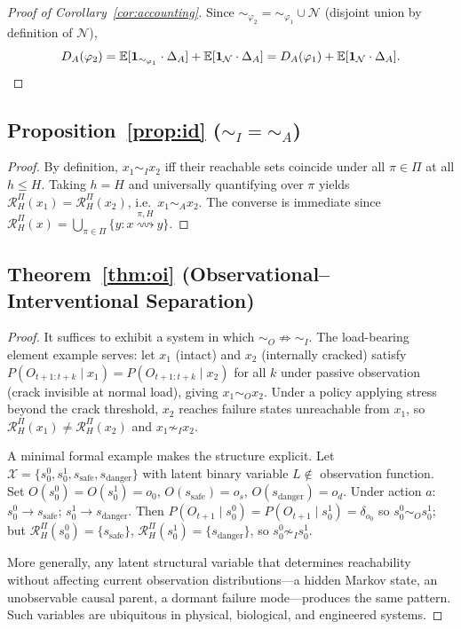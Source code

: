 \documentclass[10pt,twocolumn]{article}
\theoremstyle{plain}
\theoremstyle{definition}
\theoremstyle{remark}
\newcommand{\simA}{\sim_{\!A}}
\newcommand{\simO}{\sim_{\!O}}
\newcommand{\simI}{\sim_{\!I}}
\newcommand{\RHP}{\mathcal{R}_{H}^{\Pi}}
\newcommand{\calX}{\mathcal{X}}
\begin{document}
\begin{proof}[Proof of Corollary~\ref{cor:accounting}]
Since ${\sim_{\varphi_2}}={\sim_{\varphi_1}}\cup\mathcal{N}$ (disjoint union
by definition of $\mathcal{N}$),
\[
  D_A(\varphi_2)
  = \mathbb{E}[\mathbf{1}_{\sim_{\varphi_1}}\cdot\Delta_A]
  + \mathbb{E}[\mathbf{1}_\mathcal{N}\cdot\Delta_A]
  = D_A(\varphi_1) + \mathbb{E}[\mathbf{1}_\mathcal{N}\cdot\Delta_A]. \qedhere
\]
\end{proof}

\subsection*{Proposition~\ref{prop:id} ($\simI=\simA$)}

\begin{proof}
By definition, $x_1\simI x_2$ iff their reachable sets coincide under all
$\pi\in\Pi$ at all $h\leq H$. Taking $h=H$ and universally quantifying over
$\pi$ yields $\RHP(x_1)=\RHP(x_2)$, i.e.\ $x_1\simA x_2$. The converse is
immediate since $\RHP(x)=\bigcup_{\pi\in\Pi}\{y:x\overset{\pi,H}{\rightsquigarrow}y\}$.
\end{proof}

\subsection*{Theorem~\ref{thm:oi} (Observational--Interventional Separation)}

\begin{proof}
It suffices to exhibit a system in which $\simO\not\Rightarrow\simI$. The
load-bearing element example serves: let $x_1$ (intact) and $x_2$ (internally
cracked) satisfy $P(O_{t+1:t+k}\mid x_1)=P(O_{t+1:t+k}\mid x_2)$ for all
$k$ under passive observation (crack invisible at normal load), giving
$x_1\simO x_2$. Under a policy applying stress beyond the crack threshold,
$x_2$ reaches failure states unreachable from $x_1$, so $\RHP(x_1)\neq\RHP(x_2)$
and $x_1\not\simI x_2$.

A minimal formal example makes the structure explicit. Let
$\calX=\{s_0^0,s_0^1,s_{\mathrm{safe}},s_{\mathrm{danger}}\}$ with latent
binary variable $L\notin$ observation function. Set $O(s_0^0)=O(s_0^1)=o_0$,
$O(s_{\mathrm{safe}})=o_s$, $O(s_{\mathrm{danger}})=o_d$. Under action $a$:
$s_0^0\to s_{\mathrm{safe}}$; $s_0^1\to s_{\mathrm{danger}}$. Then
$P(O_{t+1}\mid s_0^0)=P(O_{t+1}\mid s_0^1)=\delta_{o_0}$ so $s_0^0\simO s_0^1$;
but $\RHP(s_0^0)=\{s_{\mathrm{safe}}\}$, $\RHP(s_0^1)=\{s_{\mathrm{danger}}\}$,
so $s_0^0\not\simI s_0^1$.

More generally, any latent structural variable that determines reachability without
affecting current observation distributions---a hidden Markov state, an
unobservable causal parent, a dormant failure mode---produces the same pattern.
Such variables are ubiquitous in physical, biological, and engineered systems.
\end{proof}
\end{document}
